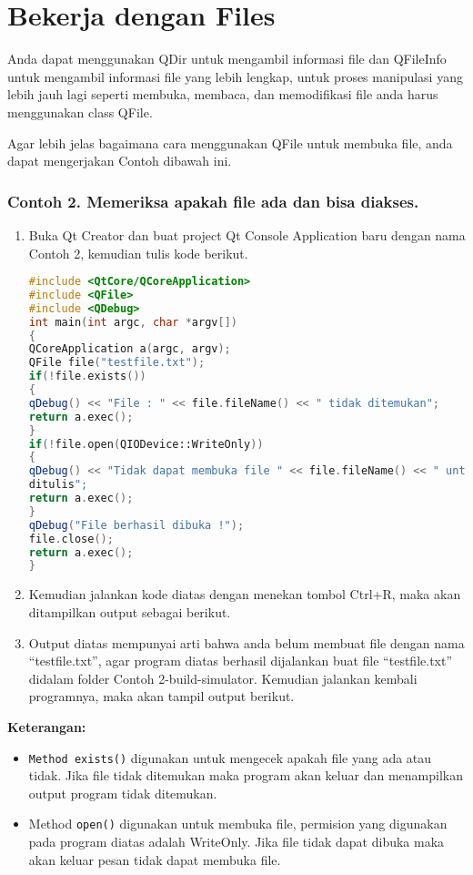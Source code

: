 \section{Bekerja dengan Files}\label{bekerja-dengan-files}

Anda dapat menggunakan QDir untuk mengambil informasi file dan QFileInfo
untuk mengambil informasi file yang lebih lengkap, untuk proses
manipulasi yang lebih jauh lagi seperti membuka, membaca, dan
memodifikasi file anda harus menggunakan class QFile.

Agar lebih jelas bagaimana cara menggunakan QFile untuk membuka file,
anda dapat mengerjakan Contoh dibawah ini.

\subsubsection*{Contoh 2. Memeriksa apakah file ada dan bisa diakses.}

\begin{enumerate}
\def\labelenumi{\arabic{enumi}.}
\item
  Buka Qt Creator dan buat project Qt Console Application baru dengan
  nama Contoh 2, kemudian tulis kode berikut.

\begin{lstlisting}[language=c++]
#include <QtCore/QCoreApplication>
#include <QFile>
#include <QDebug>
int main(int argc, char *argv[])
{
QCoreApplication a(argc, argv);
QFile file("testfile.txt");
if(!file.exists())
{
qDebug() << "File : " << file.fileName() << " tidak ditemukan";
return a.exec();
}
if(!file.open(QIODevice::WriteOnly))
{
qDebug() << "Tidak dapat membuka file " << file.fileName() << " untuk
ditulis";
return a.exec();
}
qDebug("File berhasil dibuka !");
file.close();
return a.exec();
}
\end{lstlisting}
\item
  Kemudian jalankan kode diatas dengan menekan tombol Ctrl+R, maka akan
  ditampilkan output sebagai berikut.
\item
  Output diatas mempunyai arti bahwa anda belum membuat file dengan nama
  ``testfile.txt'', agar program diatas berhasil dijalankan buat file
  ``testfile.txt'' didalam folder Contoh 2-build-simulator. Kemudian
  jalankan kembali programnya, maka akan tampil output berikut.
\end{enumerate}

\textbf{Keterangan:}

\begin{itemize}
\tightlist
\item
  \texttt{Method\ exists()} digunakan untuk mengecek apakah file yang
  ada atau tidak. Jika file tidak ditemukan maka program akan keluar dan
  menampilkan output program tidak ditemukan.
\item
  Method \texttt{open()} digunakan untuk membuka file, permision yang
  digunakan pada program diatas adalah WriteOnly. Jika file tidak dapat
  dibuka maka akan keluar pesan tidak dapat membuka file.
\end{itemize}

